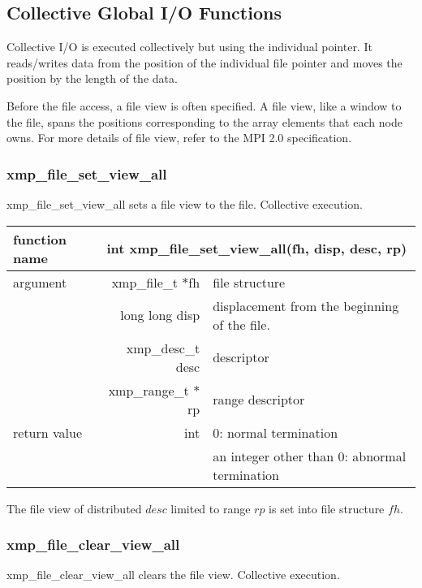    \subsection{Collective Global I/O Functions}

   Collective I/O is executed collectively but using the individual pointer.
   It reads/writes data from the position of the individual file pointer and moves the position
   by the length of the data.

   Before the file access, a file view is often specified. A file view, like a window to the file, 
   spans the positions corresponding to the array elements that each node owns. 
   For more details of file view, refer to the MPI 2.0 specification.

   \subsubsection{xmp\_file\_set\_view\_all}
   xmp\_file\_set\_view\_all sets a file view to the file. Collective execution.

   \begin{table}[h]
    \begin{center}
     \begin{tabular}{|l|r|p{70mm}|}
      \hline
      {\bf function name}  & \multicolumn{2}{c|}{\bf int xmp\_file\_set\_view\_all(fh,
      disp, desc, rp)} \\ \hline \hline
      argument & xmp\_file\_t $*$fh & file structure \\ \cline{2-3}
      & long long disp & displacement from the beginning of the file. \\ \cline{2-3}
      & xmp\_desc\_t desc & descriptor \\ \cline{2-3}
      & xmp\_range\_t $*$rp & range descriptor \\ \hline
      return value & int & 0: normal termination \\
      &  & an integer other than 0: abnormal termination \\ \hline
      \end{tabular}
     \end{center}
    \label{tb:aaa}
   \end{table}

   The file view of distributed $desc$ limited to range $rp$ is set into file structure $fh$.

   \subsubsection{xmp\_file\_clear\_view\_all}
   xmp\_file\_clear\_view\_all clears the file view. Collective execution.

